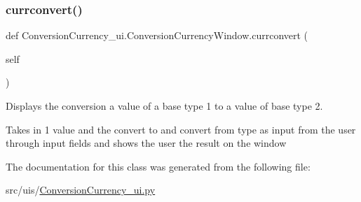 \subsubsection{\texorpdfstring{currconvert()}{currconvert()}}
{\footnotesize\ttfamily def Conversion\+Currency\+\_\+ui.\+Conversion\+Currency\+Window.\+currconvert (\begin{DoxyParamCaption}\item[{}]{self }\end{DoxyParamCaption})}



Displays the conversion a value of a base type 1 to a value of base type 2. 

Takes in 1 value and the convert to and convert from type as input from the user through input fields and shows the user the result on the window 

The documentation for this class was generated from the following file\+:\begin{DoxyCompactItemize}
\item 
src/uis/\hyperlink{_conversion_currency__ui_8py}{Conversion\+Currency\+\_\+ui.\+py}\end{DoxyCompactItemize}
